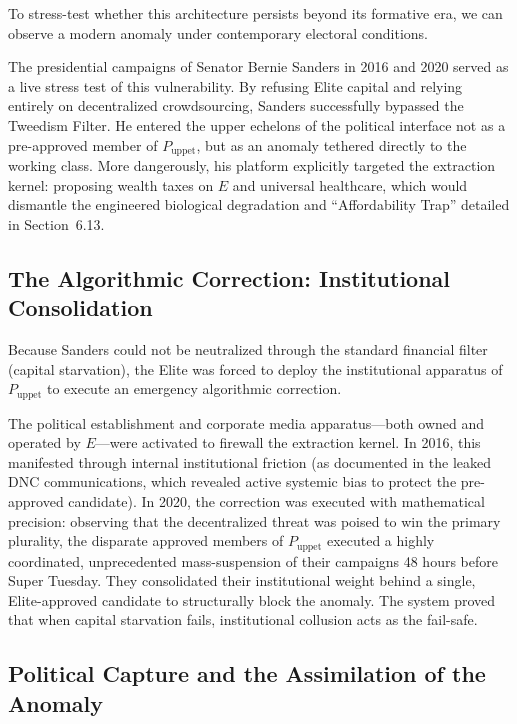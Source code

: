 \documentclass[12pt,openany]{book}
\begin{document}
To stress-test whether this architecture persists beyond its formative era, we can observe a modern anomaly under contemporary electoral conditions.

The presidential campaigns of Senator Bernie Sanders in 2016 and 2020 served as a live stress test of this vulnerability. By refusing Elite capital and relying entirely on decentralized crowdsourcing, Sanders successfully bypassed the Tweedism Filter. He entered the upper echelons of the political interface not as a pre-approved member of $P_{\text{uppet}}$, but as an anomaly tethered directly to the working class. More dangerously, his platform explicitly targeted the extraction kernel: proposing wealth taxes on $E$ and universal healthcare, which would dismantle the engineered biological degradation and ``Affordability Trap'' detailed in Section~6.13.

\subsection{The Algorithmic Correction: Institutional Consolidation}

Because Sanders could not be neutralized through the standard financial filter (capital starvation), the Elite was forced to deploy the institutional apparatus of $P_{\text{uppet}}$ to execute an emergency algorithmic correction.

The political establishment and corporate media apparatus---both owned and operated by $E$---were activated to firewall the extraction kernel. In 2016, this manifested through internal institutional friction (as documented in the leaked DNC communications, which revealed active systemic bias to protect the pre-approved candidate). In 2020, the correction was executed with mathematical precision: observing that the decentralized threat was poised to win the primary plurality, the disparate approved members of $P_{\text{uppet}}$ executed a highly coordinated, unprecedented mass-suspension of their campaigns 48 hours before Super Tuesday. They consolidated their institutional weight behind a single, Elite-approved candidate to structurally block the anomaly. The system proved that when capital starvation fails, institutional collusion acts as the fail-safe.

\subsection{Political Capture and the Assimilation of the Anomaly}
\end{document}

